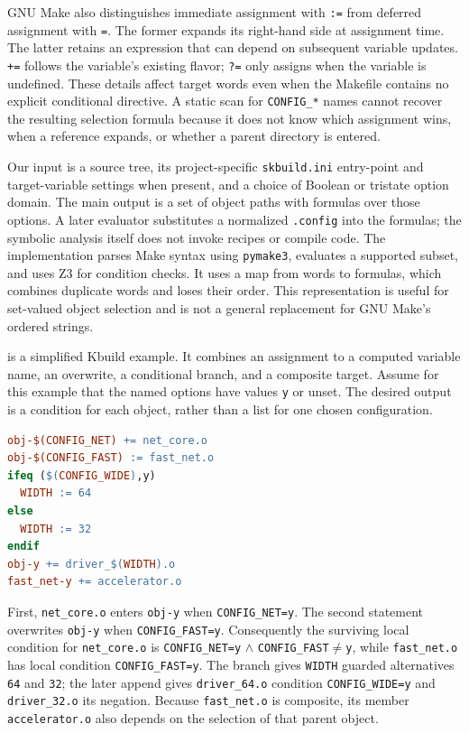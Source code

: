 \documentclass[acmsmall,screen,review]{acmart}
\begin{document}
GNU Make also distinguishes immediate assignment with \texttt{:=} from deferred assignment with \texttt{=}. The former expands its right-hand side at assignment time. The latter retains an expression that can depend on subsequent variable updates. \texttt{+=} follows the variable's existing flavor; \texttt{?=} only assigns when the variable is undefined. These details affect target words even when the Makefile contains no explicit conditional directive. A static scan for \texttt{CONFIG\_*} names cannot recover the resulting selection formula because it does not know which assignment wins, when a reference expands, or whether a parent directory is entered.


Our input is a source tree, its project-specific \texttt{skbuild.ini} entry-point and target-variable settings when present, and a choice of Boolean or tristate option domain. The main output is a set of object paths with formulas over those options. A later evaluator substitutes a normalized \texttt{.config} into the formulas; the symbolic analysis itself does not invoke recipes or compile code. The implementation parses Make syntax using \texttt{pymake3}, evaluates a supported subset, and uses Z3 for condition checks. It uses a map from words to formulas, which combines duplicate words and loses their order. This representation is useful for set-valued object selection and is not a general replacement for GNU Make's ordered strings.


 is a simplified Kbuild example. It combines an assignment to a computed variable name, an overwrite, a conditional branch, and a composite target. Assume for this example that the named options have values \texttt{y} or unset. The desired output is a condition for each object, rather than a list for one chosen configuration.

\begin{lstlisting}[language=make,float=t,caption={Simplified Kbuild example. The final object conditions also depend on the guard under which this directory is entered.},label={lst:example}]
obj-$(CONFIG_NET) += net_core.o
obj-$(CONFIG_FAST) := fast_net.o
ifeq ($(CONFIG_WIDE),y)
  WIDTH := 64
else
  WIDTH := 32
endif
obj-y += driver_$(WIDTH).o
fast_net-y += accelerator.o
\end{lstlisting}

First, \texttt{net\_core.o} enters \texttt{obj-y} when \texttt{CONFIG\_NET=y}. The second statement overwrites \texttt{obj-y} when \texttt{CONFIG\_FAST=y}. Consequently the surviving local condition for \texttt{net\_core.o} is \texttt{CONFIG\_NET=y} $\land$ \texttt{CONFIG\_FAST}$\ne$\texttt{y}, while \texttt{fast\_net.o} has local condition \texttt{CONFIG\_FAST=y}. The branch gives \texttt{WIDTH} guarded alternatives \texttt{64} and \texttt{32}; the later append gives \texttt{driver\_64.o} condition \texttt{CONFIG\_WIDE=y} and \texttt{driver\_32.o} its negation. Because \texttt{fast\_net.o} is composite, its member \texttt{accelerator.o} also depends on the selection of that parent object.
\end{document}
